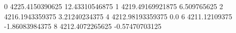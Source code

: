 0 4225.4150390625 12.43310546875
1 4219.49169921875 6.509765625
2 4216.1943359375 3.21240234375
4 4212.98193359375 0.0
6 4211.12109375 -1.86083984375
8 4212.4072265625 -0.57470703125
